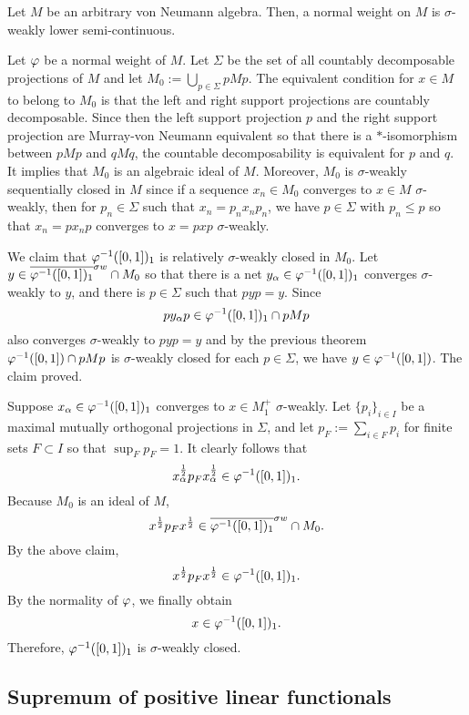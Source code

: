 \documentclass{../../../small}
\begin{document}
\begin{thm}
Let $M$ be an arbitrary von Neumann algebra.
Then, a normal weight on $M$ is $\sigma$-weakly lower semi-continuous.
\end{thm}
\begin{pf}
Let $\varphi$ be a normal weight of $M$.
Let $\Sigma$ be the set of all countably decomposable projections of $M$ and let $M_0:=\bigcup_{p\in\Sigma}pMp$.
The equivalent condition for $x\in M$ to belong to $M_0$ is that the left and right support projections are countably decomposable.
Since then the left support projection $p$ and the right support projection are Murray-von Neumann equivalent so that there is a $*$-isomorphism between $pMp$ and $qMq$, the countable decomposability is equivalent for $p$ and $q$.
It implies that $M_0$ is an algebraic ideal of $M$.
Moreover, $M_0$ is $\sigma$-weakly sequentially closed in $M$ since if a sequence $x_n\in M_0$ converges to $x\in M$ $\sigma$-weakly, then for $p_n\in\Sigma$ such that $x_n=p_nx_np_n$, we have $p\in\Sigma$ with $p_n\le p$ so that $x_n=px_np$ converges to $x=pxp$ $\sigma$-weakly.

We claim that $\varphi^{-1}([0,1])_1$ is relatively $\sigma$-weakly closed in $M_0$.
Let $y\in\overline{\varphi^{-1}([0,1])_1}^{\sigma w}\cap M_0$ so that there is a net $y_\alpha\in\varphi^{-1}([0,1])_1$ converges $\sigma$-weakly to $y$, and there is $p\in\Sigma$ such that $pyp=y$.
Since
\[py_\alpha p\in\varphi^{-1}([0,1])_1\cap pMp\]
also converges $\sigma$-weakly to $pyp=y$ and by the previous theorem $\varphi^{-1}([0,1])\cap pMp$ is $\sigma$-weakly closed for each $p\in\Sigma$, we have $y\in\varphi^{-1}([0,1])$.
The claim proved.

Suppose $x_\alpha\in\varphi^{-1}([0,1])_1$ converges to $x\in M_1^+$ $\sigma$-weakly.
Let $\{p_i\}_{i\in I}$ be a maximal mutually orthogonal projections in $\Sigma$, and let $p_F:=\sum_{i\in F}p_i$ for finite sets $F\subset I$ so that $\sup_Fp_F=1$.
It clearly follows that
\[x_\alpha^{\frac12}p_Fx_\alpha^{\frac12}\in\varphi^{-1}([0,1])_1.\]
Because $M_0$ is an ideal of $M$,
\[x^{\frac12}p_Fx^{\frac12}\in\overline{\varphi^{-1}([0,1])_1}^{\sigma w}\cap M_0.\]
By the above claim,
\[x^{\frac12}p_Fx^{\frac12}\in\varphi^{-1}([0,1])_1.\]
By the normality of $\varphi$, we finally obtain
\[x\in\varphi^{-1}([0,1])_1.\]
Therefore, $\varphi^{-1}([0,1])_1$ is $\sigma$-weakly closed.
\end{pf}


\subsection{Supremum of positive linear functionals}
\end{document}
